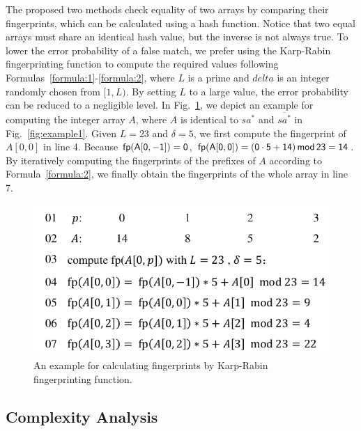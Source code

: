 \documentclass[10pt,journal,compsoc]{IEEEtran}
\begin{document}
The proposed two methods check equality of two arrays by comparing their fingerprints, which can be calculated using a hash function. Notice that two equal arrays must share an identical hash value, but the inverse is not always true. To lower the error probability of a false match, we prefer using the Karp-Rabin fingerprinting function to compute the required values following Formulas~\ref{formula:1}-\ref{formula:2}, where $L$ is a prime and $delta$ is an integer randomly chosen from $[1, L)$. By setting $L$ to a large value, the error probability can be reduced to a negligible level. In Fig.~\ref{fig:example2}, we depict an example for computing the integer array $A$, where $A$ is identical to $sa^*$ and $\overline{sa^*}$ in Fig.~\ref{fig:example1}. Given $L = 23$ and $\delta = 5$, we first compute the fingerprint of $A[0, 0]$ in line 4. Because $\sf fp(A[0, -1]) = 0$, $\sf fp(A[0, 0]) = (0 \cdot 5 + 14) \, mod \, 23 = 14$. By iteratively computing the fingerprints of the prefixes of $A$ according to Formula~\ref{formula:2}, we finally obtain the fingerprints of the whole array in line 7.

\begin{figure}[htbp!]
	\centering
	
	\includegraphics[width = 1\columnwidth]{example2.pdf}
	
	\caption{An example for calculating fingerprints by Karp-Rabin fingerprinting function.}
	
	\label{fig:example2}
	
\end{figure}

\subsection{Complexity Analysis}
\end{document}
